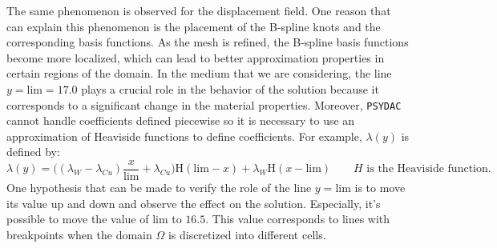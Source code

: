 \documentclass[a4paper,12pt,twoside]{report}
\begin{document}
The same phenomenon is observed for the displacement field.
One reason that can explain this phenomenon is the placement of the B-spline knots and the corresponding basis functions. As the mesh is refined, the B-spline basis functions become more localized, which can lead to better approximation properties in certain regions of the domain. In the medium that we are considering, the line $y = \text{lim} = 17.0$ plays a crucial role in the behavior of the solution because it corresponds to a significant change in the material properties. Moreover, \texttt{PSYDAC} cannot handle coefficients defined piecewise so it is necessary to use an approximation of Heaviside functions to define coefficients. For example, $\lambda(y)$ is defined by:
$$ \lambda(y) = \big( (\lambda_W - \lambda_{Cu}) \frac{x}{\text{lim}} + \lambda_{Cu} \big) \text{H}(\text{lim}-x) + \lambda_{W} \text{H}(x-\text{lim}) \qquad H \text{ is the Heaviside function}.$$
One hypothesis that can be made to verify the role of the line $y = \text{lim}$ is to move its value up and down and observe the effect on the solution. Especially, it's possible to move the value of $\text{lim}$ to $16.5$. This value corresponds to lines with breakpoints when the domain $\Omega$ is discretized into different cells. 
\end{document}
